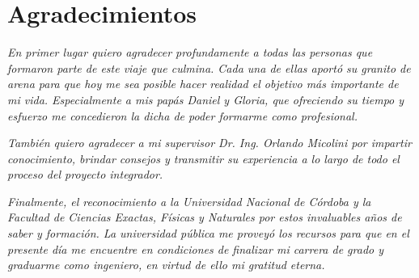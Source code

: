 \documentclass[a4paper,12pt]{article}
\begin{document}
\newpage
\thispagestyle{empty}
\section*{Agradecimientos}
\vspace*{\fill}

\begin{flushright}
	\textit{En primer lugar quiero agradecer profundamente a todas las personas que formaron parte de este viaje que culmina. Cada una de ellas aportó su granito de arena para que hoy me sea posible hacer realidad el objetivo más importante de mi vida. Especialmente a mis papás Daniel y Gloria, que ofreciendo su tiempo y esfuerzo me concedieron la dicha de poder formarme como profesional.}
\end{flushright}

\begin{flushright}
	\textit{También quiero agradecer a mi supervisor Dr. Ing. Orlando Micolini por impartir conocimiento, brindar consejos y transmitir su experiencia a lo largo de todo el proceso del proyecto integrador.}
\end{flushright}

\begin{flushright}
	\textit{Finalmente, el reconocimiento a la Universidad Nacional de Córdoba y la Facultad de Ciencias Exactas, Físicas y Naturales por estos invaluables años de saber y formación. La universidad pública me proveyó los recursos para que en el presente día me encuentre en condiciones de finalizar mi carrera de grado y graduarme como ingeniero, en virtud de ello mi gratitud eterna.}
\end{flushright}

\vspace*{\fill}

\clearpage

\tableofcontents

\clearpage

%
%
\clearpage
\end{document}
